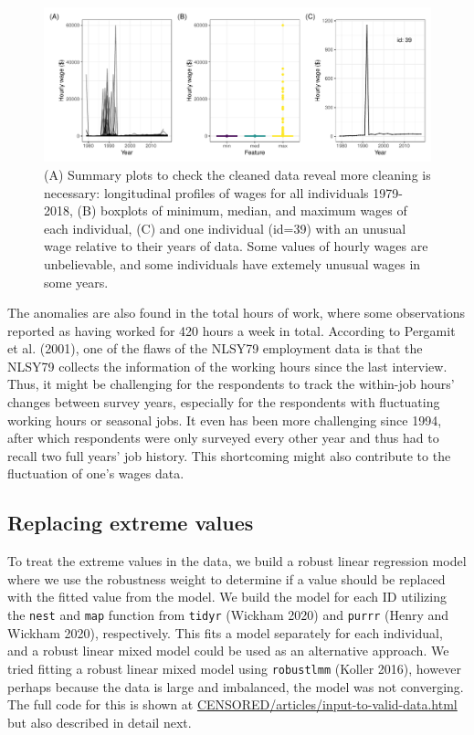 \documentclass{article}
\begin{document}
\begin{figure}

{\centering \includegraphics[width=1\linewidth]{figures/feature-plot-1} 

}

\caption{(A) Summary plots to check the cleaned data reveal more cleaning is necessary: longitudinal profiles of wages for all individuals 1979-2018, (B) boxplots of minimum, median, and maximum wages of each individual, (C) and one individual (id=39) with an unusual wage relative to their years of data. Some values of hourly wages are unbelievable, and some individuals have extemely unusual wages in some years.}\label{fig:feature-plot}
\end{figure}

The anomalies are also found in the total hours of work, where some observations reported as having worked for 420 hours a week in total. According to Pergamit et al. (2001), one of the flaws of the NLSY79 employment data is that the NLSY79 collects the information of the working hours since the last interview. Thus, it might be challenging for the respondents to track the within-job hours' changes between survey years, especially for the respondents with fluctuating working hours or seasonal jobs. It even has been more challenging since 1994, after which respondents were only surveyed every other year and thus had to recall two full years' job history. This shortcoming might also contribute to the fluctuation of one's wages data.

\hypertarget{censor}{%
\subsection{Replacing extreme values}\label{censor}}

To treat the extreme values in the data, we build a robust linear regression model where we use the robustness weight to determine if a value should be replaced with the fitted value from the model. We build the model for each ID utilizing the \texttt{nest} and \texttt{map} function from \texttt{tidyr} (Wickham 2020) and \texttt{purrr} (Henry and Wickham 2020), respectively. This fits a model separately for each individual, and a robust linear mixed model could be used as an alternative approach. We tried fitting a robust linear mixed model using \texttt{robustlmm} (Koller 2016), however perhaps because the data is large and imbalanced, the model was not converging. The full code for this is shown at \url{CENSORED/articles/input-to-valid-data.html} but also described in detail next.
\end{document}
